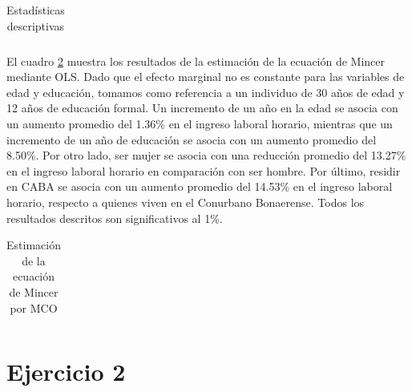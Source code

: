 \documentclass[11pt]{article}
\begin{document}
\begin{table}[H]
    \centering
    \caption[Estadísticas descriptivas]{Estadísticas descriptivas}
    \label{tab:sum_stats}
    \begin{adjustbox}{max width=\textwidth}
        \begin{tabular}{l*{2}{c}}
            
        \end{tabular}
    \end{adjustbox}
\end{table}

El cuadro \ref{tab:OLS_mincer} muestra los resultados de la estimación de la ecuación de Mincer mediante OLS. Dado que el efecto marginal no es constante para las variables de edad y educación, tomamos como referencia a un individuo de 30 años de edad y 12 años de educación formal. Un incremento de un año en la edad se asocia con un aumento promedio del 1.36\% en el ingreso laboral horario, mientras que un incremento de un año de educación se asocia con un aumento promedio del 8.50\%. Por otro lado, ser mujer se asocia con una reducción promedio del 13.27\% en el ingreso laboral horario en comparación con ser hombre. Por último, residir en CABA se asocia con un aumento promedio del 14.53\% en el ingreso laboral horario, respecto a quienes viven en el Conurbano Bonaerense. Todos los resultados descritos son significativos al 1\%.
\begin{table}[H]
    \centering
    \caption[Estimación de la ecuación de Mincer por MCO]{Estimación de la ecuación de Mincer por MCO}
    \label{tab:OLS_mincer}
    \begin{adjustbox}{max width=0.8\textwidth}
        \begin{tabular}{l*{2}{c}}
            
        \end{tabular}
    \end{adjustbox}
\end{table}


\section*{Ejercicio 2}
\end{document}
